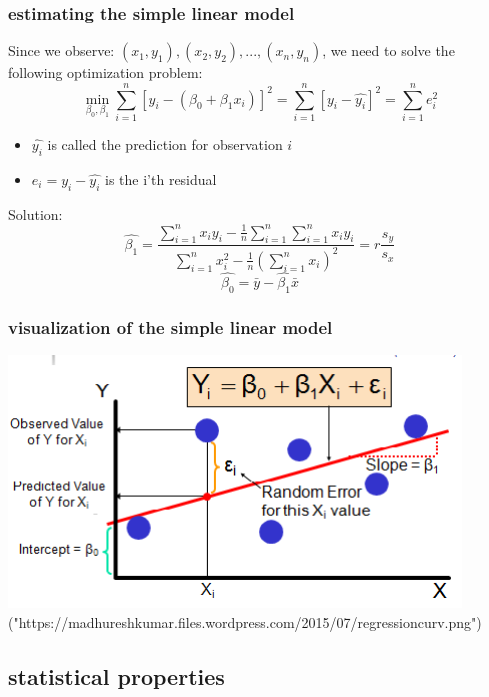 \documentclass{beamer}
\begin{document}
\begin{frame}
\frametitle{estimating the simple linear model}
Since we observe: $(x_1,y_1),(x_2, y_2), ..., (x_n, y_n)$, we need to solve the following optimization problem:
\begin{equation*}
\min_{\beta_0, \beta_1} \sum_{i = 1}^n [y_i- (\beta_0 + \beta_1 x_i)]^2 = \sum_{i = 1}^n [y_i- \hat{y_i}]^2  = \sum_{i = 1}^n e_i^2
\end{equation*}
\begin{itemize}
\item $\hat{y_i}$ is called the prediction for observation $i$
\item $e_i = y_i  - \hat{y_i}$ is the i'th residual
\end{itemize}
Solution:
\begin{equation*}
\hat{\beta_1} = \frac{\sum_{i = 1}^n x_i y_i - \frac{1}{n} \sum_{i = 1}^{n}\sum_{i = 1}^n x_i y_i }{\sum_{i = 1}^n x_i^2 -\frac{1}{n} (\sum_{i = 1}^n x_i )^2 } = r \frac{s_y}{s_x}
\end{equation*}
\begin{equation*}
\hat{\beta_0} = \bar{y} - \hat{\beta_1} \bar{x}
\end{equation*}
\end{frame}


\begin{frame}
\frametitle{visualization of the simple linear model}
\includegraphics[width=0.9\textwidth]{figures/03/regressioncurv.png}
\newline
\tiny("https://madhureshkumar.files.wordpress.com/2015/07/regressioncurv.png")
\end{frame}

\subsection{statistical properties}
\end{document}
